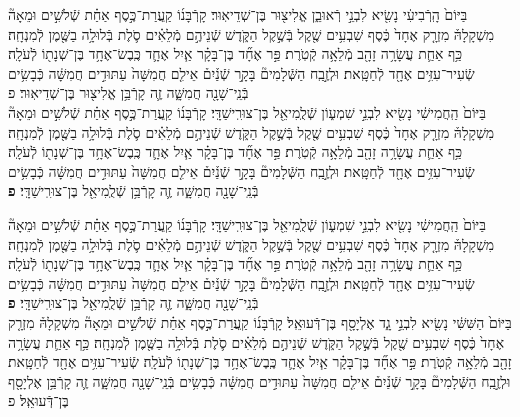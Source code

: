 \documentclass[twoside, openany, parskip=half, 11pt]{book}
\begin{document}
\begin{footnotesize}
\begin{multicols}{2}
בַּיּוֹם֙ הָֽרְֿבִיעִ֔י נָשִׂ֖יא לִבְנֵ֣י רְֿאוּבֵ֑ן אֱלִיצ֖וּר בֶּן־שְׁדֵיאֽוּר׃ קָרְֿבָּנ֜וֹ קַֽעֲרַת־כֶּ֣סֶף אַחַ֗ת שְֿׁלֹשִׁ֣ים וּמֵאָה֘ מִשְׁקָלָהּ֒ מִזְרָ֤ק אֶחָד֙ כֶּ֔סֶף שִׁבְעִ֥ים שֶׁ֖קֶל בְּֿשֶׁ֣קֶל הַקֹּ֑דֶשׁ שְֿׁנֵיהֶ֣ם מְֿלֵאִ֗ים סֹ֛לֶת בְּֿלוּלָ֥ה בַשֶּׁ֖מֶן לְֿמִנְחָֽה׃ כַּ֥ף אַחַ֛ת עֲשָׂרָ֥ה זָהָ֖ב מְֿלֵאָ֥ה קְֿטֹֽרֶת׃  פַּ֣ר אֶחָ֞ד בֶּן־בָּקָ֗ר אַ֧יִל אֶחָ֛ד כֶּֽבֶשׂ־אֶחָ֥ד בֶּן־שְׁנָת֖וֹ לְֿעֹלָֽה׃ שְֿׂעִיר־עִזִּ֥ים אֶחָ֖ד לְֿחַטָּֽאת׃ וּלְזֶ֣בַֽח הַשְּֿׁלָמִים֘ בָּקָ֣ר שְֿׁנַ֒יִם֒ אֵילִ֤ם חֲמִשָּׁה֙ עַתּוּדִ֣ים חֲמִשָּׁ֔ה כְּֿבָשִׂ֥ים בְּֿנֵֽי־שָׁנָ֖ה חֲמִשָּׁ֑ה זֶ֛ה קָרְֿבַּ֥ן אֱלִיצ֖וּר בֶּן־שְׁדֵיאֽוּר׃ פ\\
 בַּיּוֹם֙ הַֽחֲמִישִׁ֔י נָשִׂ֖יא לִבְנֵ֣י שִׁמְע֑וֹן שְֿׁלֻֽמִיאֵ֖ל בֶּן־צוּרִֽישַׁדָּֽי׃ קָרְֿבָּנ֜וֹ קַֽעֲרַת־כֶּ֣סֶף אַחַ֗ת שְֿׁלֹשִׁ֣ים וּמֵאָה֘ מִשְׁקָלָהּ֒ מִזְרָ֤ק אֶחָד֙ כֶּ֔סֶף שִׁבְעִ֥ים שֶׁ֖קֶל בְּֿשֶׁ֣קֶל הַקֹּ֑דֶשׁ שְֿׁנֵיהֶ֣ם מְֿלֵאִ֗ים סֹ֛לֶת בְּֿלוּלָ֥ה בַשֶּׁ֖מֶן לְֿמִנְחָֽה׃ כַּ֥ף אַחַ֛ת עֲשָׂרָ֥ה זָהָ֖ב מְֿלֵאָ֥ה קְֿטֹֽרֶת׃ פַּ֣ר אֶחָ֞ד בֶּן־בָּקָ֗ר אַ֧יִל אֶחָ֛ד כֶּֽבֶשׂ־אֶחָ֥ד בֶּן־שְׁנָת֖וֹ לְֿעֹלָֽה׃ שְֿׂעִיר־עִזִּ֥ים אֶחָ֖ד לְֿחַטָּֽאת׃ וּלְזֶ֣בַֽח הַשְּֿׁלָמִים֘ בָּקָ֣ר שְֿׁנַ֒יִם֒ אֵילִ֤ם חֲמִשָּׁה֙ עַתּוּדִ֣ים חֲמִשָּׁ֔ה כְּֿבָשִׂ֥ים בְּֿנֵֽי־שָׁנָ֖ה חֲמִשָּׁ֑ה זֶ֛ה קָרְֿבַּ֥ן שְֿׁלֻֽמִיאֵ֖ל בֶּן־צוּרִֽישַׁדָּֽי׃ \textbf{פ}

\vfill\null
\columnbreak


בַּיּוֹם֙ הַֽחֲמִישִׁ֔י נָשִׂ֖יא לִבְנֵ֣י שִׁמְע֑וֹן שְֿׁלֻֽמִיאֵ֖ל בֶּן־צוּרִֽישַׁדָּֽי׃ קָרְֿבָּנ֜וֹ קַֽעֲרַת־כֶּ֣סֶף אַחַ֗ת שְֿׁלֹשִׁ֣ים וּמֵאָה֘ מִשְׁקָלָהּ֒ מִזְרָ֤ק אֶחָד֙ כֶּ֔סֶף שִׁבְעִ֥ים שֶׁ֖קֶל בְּֿשֶׁ֣קֶל הַקֹּ֑דֶשׁ שְֿׁנֵיהֶ֣ם מְֿלֵאִ֗ים סֹ֛לֶת בְּֿלוּלָ֥ה בַשֶּׁ֖מֶן לְֿמִנְחָֽה׃ כַּ֥ף אַחַ֛ת עֲשָׂרָ֥ה זָהָ֖ב מְֿלֵאָ֥ה קְֿטֹֽרֶת׃  פַּ֣ר אֶחָ֞ד בֶּן־בָּקָ֗ר אַ֧יִל אֶחָ֛ד כֶּֽבֶשׂ־אֶחָ֥ד בֶּן־שְׁנָת֖וֹ לְֿעֹלָֽה׃ שְֿׂעִיר־עִזִּ֥ים אֶחָ֖ד לְֿחַטָּֽאת׃ וּלְזֶ֣בַֽח הַשְּֿׁלָמִים֘ בָּקָ֣ר שְֿׁנַ֒יִם֒ אֵילִ֤ם חֲמִשָּׁה֙ עַתּוּדִ֣ים חֲמִשָּׁ֔ה כְּֿבָשִׂ֥ים בְּֿנֵֽי־שָׁנָ֖ה חֲמִשָּׁ֑ה זֶ֛ה קָרְֿבַּ֥ן שְֿׁלֻֽמִיאֵ֖ל בֶּן־צוּרִֽישַׁדָּֽי׃ \textbf{פ} \\
 בַּיּוֹם֙ הַשִּׁשִּׁ֔י נָשִׂ֖יא לִבְנֵ֣י גָ֑ד אֶלְיָסָ֖ף בֶּן־דְּֿעוּאֵֽל׃ קָרְֿבָּנ֜וֹ קַֽעֲרַת־כֶּ֣סֶף אַחַ֗ת שְֿׁלֹשִׁ֣ים וּמֵאָה֘ מִשְׁקָלָהּ֒ מִזְרָ֤ק אֶחָד֙ כֶּ֔סֶף שִׁבְעִ֥ים שֶׁ֖קֶל בְּֿשֶׁ֣קֶל הַקֹּ֑דֶשׁ שְֿׁנֵיהֶ֣ם מְֿלֵאִ֗ים סֹ֛לֶת בְּֿלוּלָ֥ה בַשֶּׁ֖מֶן לְֿמִנְחָֽה׃ כַּ֥ף אַחַ֛ת עֲשָׂרָ֥ה זָהָ֖ב מְֿלֵאָ֥ה קְֿטֹֽרֶת׃ פַּ֣ר אֶחָ֞ד בֶּן־בָּקָ֗ר אַ֧יִל אֶחָ֛ד כֶּֽבֶשׂ־אֶחָ֥ד בֶּן־שְׁנָת֖וֹ לְֿעֹלָֽה׃ שְֿׂעִיר־עִזִּ֥ים אֶחָ֖ד לְֿחַטָּֽאת׃ וּלְזֶ֣בַֽח הַשְּֿׁלָמִים֘ בָּקָ֣ר שְֿׁנַ֒יִם֒ אֵילִ֤ם חֲמִשָּׁה֙ עַתּוּדִ֣ים חֲמִשָּׁ֔ה כְּֿבָשִׂ֥ים בְּֿנֵֽי־שָׁנָ֖ה חֲמִשָּׁ֑ה זֶ֛ה קָרְֿבַּ֥ן אֶלְיָסָ֖ף בֶּן־דְּֿעוּאֵֽל׃ פ


\end{multicols}
\end{footnotesize}
\end{document}
